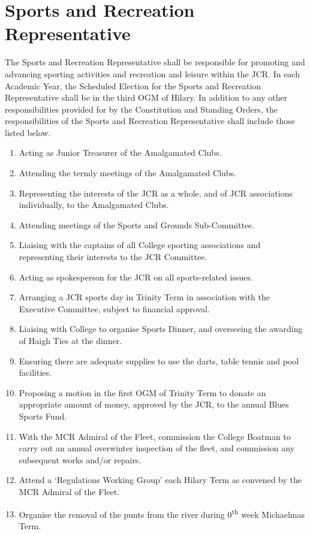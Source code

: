 \section{Sports and Recreation Representative}
\npara The Sports and Recreation Representative shall be responsible for promoting and advancing sporting activities and recreation and leisure within the JCR. 
\npara In each Academic Year, the Scheduled Election for the Sports and Recreation Representative shall be in the third OGM of Hilary.
\npara In addition to any other responsibilities provided for by the Constitution and Standing Orders, the responsibilities of the Sports and Recreation Representative shall include those listed below.
\begin{enumerate}
	\item Acting as Junior Treasurer of the Amalgamated Clubs.
	\item Attending the termly meetings of the Amalgamated Clubs.
	\item Representing the interests of the JCR as a whole, and of JCR associations individually, to the Amalgamated Clubs.
	\item Attending meetings of the Sports and Grounds Sub-Committee.
	\item Liaising with the captains of all College sporting associations and representing their interests to the JCR Committee.
	\item Acting as spokesperson for the JCR on all sports-related issues.
	\item Arranging a JCR sports day in Trinity Term in association with the Executive Committee, subject to financial approval.
	\item Liaising with College to organise Sports Dinner, and overseeing the awarding of Haigh Ties at the dinner.
	\item Ensuring there are adequate supplies to use the darts, table tennis and pool facilities.
	\item Proposing a motion in the first OGM of Trinity Term to donate an appropriate amount of money, approved by the JCR, to the annual Blues Sports Fund.
	\item With the MCR Admiral of the Fleet, commission the College Boatman to carry out an annual overwinter inspection of the fleet, and commission any subsequent works and/or repairs.
	\item Attend a `Regulations Working Group' each Hilary Term as convened by the MCR Admiral of the Fleet.
	\item Organise the removal of the punts from the river during 0\textsuperscript{th} week Michaelmas Term.

\end{enumerate}
